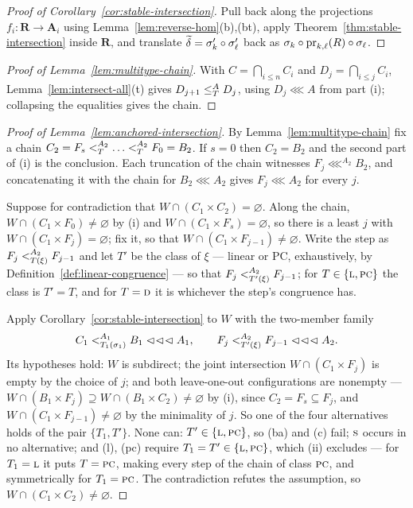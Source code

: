 \begin{proof}[Proof of Corollary~\ref{cor:stable-intersection}]
Pull back along the projections $f_{i}:\mathbf R\to\mathbf A_{i}$ using
Lemma~\ref{lem:reverse-hom}(b),(bt), apply
Theorem~\ref{thm:stable-intersection} inside $\mathbf R$, and translate
$\bcol\delta=\sigma_{k}'\circ\sigma_{\ell}'$ back as
$\sigma_{k}\circ\proj_{k,\ell}(R)\circ\sigma_{\ell}$.
\end{proof}

\begin{proof}[Proof of Lemma~\ref{lem:multitype-chain}]
With $C=\bigcap_{i\le n}C_{i}$ and $D_{j}=\bigcap_{i\le j}C_{i}$,
Lemma~\ref{lem:intersect-all}(t) gives $D_{j+1}\subte[A]{T}D_{j}$, using
$D_{j}\lll A$ from part (i); collapsing the equalities gives the chain.
\end{proof}

\begin{proof}[Proof of Lemma~\ref{lem:anchored-intersection}]
By Lemma~\ref{lem:multitype-chain} fix a chain
$C_{2}=F_{s}\subt[A_{2}]{T}\dots\subt[A_{2}]{T}F_{0}=B_{2}$. If $s=0$ then
$C_{2}=B_{2}$ and the second part of (i) is the conclusion. Each truncation
of the chain witnesses $F_{j}\lll^{A_{2}}B_{2}$, and concatenating it with
the chain for $B_{2}\lll A_{2}$ gives $F_{j}\lll A_{2}$ for every $j$.

Suppose for contradiction that $W\cap(C_{1}\times C_{2})=\varnothing$. Along
the chain, $W\cap(C_{1}\times F_{0})\neq\varnothing$ by (i) and
$W\cap(C_{1}\times F_{s})=\varnothing$, so there is a least $j$ with
$W\cap(C_{1}\times F_{j})=\varnothing$; fix it, so that
$W\cap(C_{1}\times F_{j-1})\neq\varnothing$. Write the step as
$F_{j}\subt[A_{2}]{T(\xi)}F_{j-1}$ and let $T'$ be the class of $\xi$ ---
linear or PC, exhaustively, by Definition~\ref{def:linear-congruence} --- so
that $F_{j}\subt[A_{2}]{T'(\xi)}F_{j-1}$; for $T\in\{\TL,\TPC\}$ the class
is $T'=T$, and for $T=\TD$ it is whichever the step's congruence has.

Apply Corollary~\ref{cor:stable-intersection} to $W$ with the two-member
family
\[
  C_{1}\subt[A_{1}]{T_{1}(\sigma_{1})}B_{1}\lll A_{1},
  \qquad
  F_{j}\subt[A_{2}]{T'(\xi)}F_{j-1}\lll A_{2}.
\]
Its hypotheses hold: $W$ is subdirect; the joint intersection
$W\cap(C_{1}\times F_{j})$ is empty by the choice of $j$; and both
leave-one-out configurations are nonempty ---
$W\cap(B_{1}\times F_{j})\supseteq W\cap(B_{1}\times C_{2})\neq\varnothing$
by (i), since $C_{2}=F_{s}\subseteq F_{j}$, and
$W\cap(C_{1}\times F_{j-1})\neq\varnothing$ by the minimality of $j$. So one
of the four alternatives holds of the pair $\{T_{1},T'\}$. None can:
$T'\in\{\TL,\TPC\}$, so (ba) and (c) fail; $\TS$ occurs in no alternative;
and (l), (pc) require $T_{1}=T'\in\{\TL,\TPC\}$, which (ii) excludes ---
for $T_{1}=\TL$ it puts $T=\TPC$, making every step of the chain of class
$\TPC$, and symmetrically for $T_{1}=\TPC$. The contradiction refutes the
assumption, so $W\cap(C_{1}\times C_{2})\neq\varnothing$.
\end{proof}

